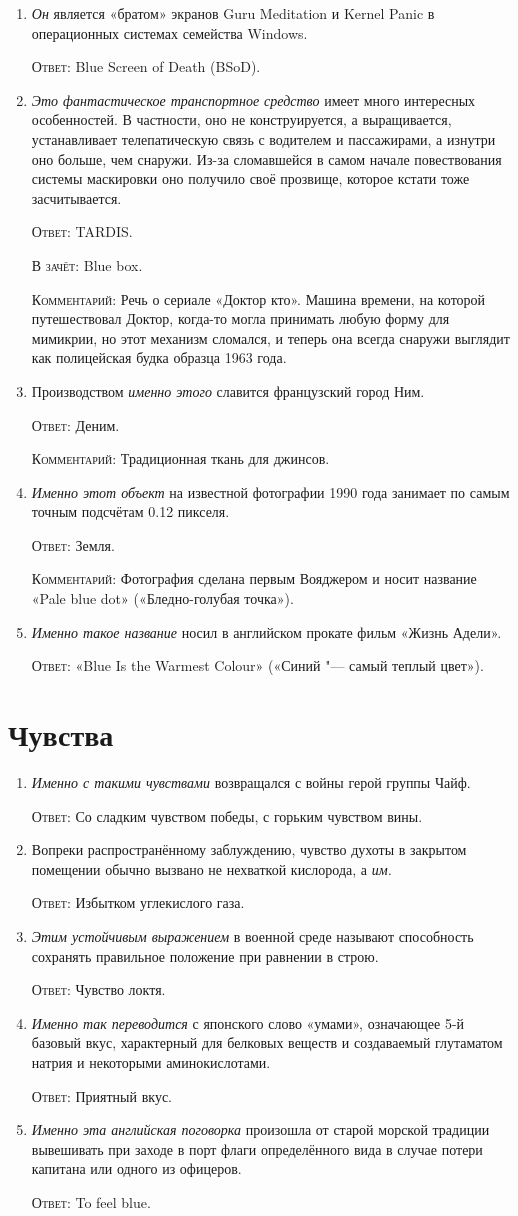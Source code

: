\documentclass[a4paper,10pt]{article}
\let\keyword\textsc
\newenvironment{topic}{\begin{enumerate}}{\end{enumerate}}
\newcommand{\question}[3]{\item[#1.] #2 \par \keyword{Ответ:} #3}
\newcommand{\alternative}[1]{\par \keyword{В зачёт:} #1}
\newcommand{\commentary}[1]{\par \keyword{Комментарий:} #1}
\begin{document}
\begin{topic}
  \question{10}{\emph{Он} является «братом» экранов Guru Meditation и Kernel Panic в операционных системах семейства Windows.}{Blue Screen of Death (BSoD).}
  \question{20}{\emph{Это фантастическое транспортное средство} имеет много интересных особенностей. В частности, оно не конструируется, а выращивается, устанавливает телепатическую связь с водителем и пассажирами, а изнутри оно больше, чем снаружи. Из-за сломавшейся в самом начале повествования системы маскировки оно получило своё прозвище, которое кстати тоже засчитывается.}{TARDIS.}\alternative{Blue box.}\commentary{Речь о сериале «Доктор кто». Машина времени, на которой путешествовал Доктор, когда-то могла принимать любую форму для мимикрии, но этот механизм сломался, и теперь она всегда снаружи выглядит как полицейская будка образца 1963 года.}
  \question{30}{Производством \emph{именно этого} славится французский город Ним.}{Деним.}\commentary{Традиционная ткань для джинсов.}
  \question{40}{\emph{Именно этот объект} на известной фотографии 1990 года занимает по самым точным подсчётам 0.12 пикселя.}{Земля.}\commentary{Фотография сделана первым Вояджером и носит название «Pale blue dot» («Бледно-голубая точка»).}
  \question{50}{\emph{Именно такое название} носил в английском прокате фильм «Жизнь Адели».}{«Blue Is the Warmest Colour» («Синий "--- самый теплый цвет»).}
\end{topic}


\section{Чувства}

\begin{topic}
  \question{10}{\emph{Именно с такими чувствами} возвращался с войны герой группы Чайф.}{Со сладким чувством победы, с горьким чувством вины.}
  \question{20}{Вопреки распространённому заблуждению, чувство духоты в закрытом помещении обычно вызвано не нехваткой кислорода, а \emph{им.}}{Избытком углекислого газа.}
  \question{30}{\emph{Этим устойчивым выражением} в военной среде называют способность сохранять правильное положение при равнении в строю.}{Чувство локтя.}
  \question{40}{\emph{Именно так переводится} с японского слово «умами», означающее 5-й базовый вкус, характерный для белковых веществ и создаваемый глутаматом натрия и некоторыми аминокислотами.}{Приятный вкус.}
  \question{50}{\emph{Именно эта английская поговорка} произошла от старой морской традиции вывешивать при заходе в порт флаги определённого вида в случае потери капитана или одного из офицеров.}{To feel blue.}
\end{topic}
\end{document}
